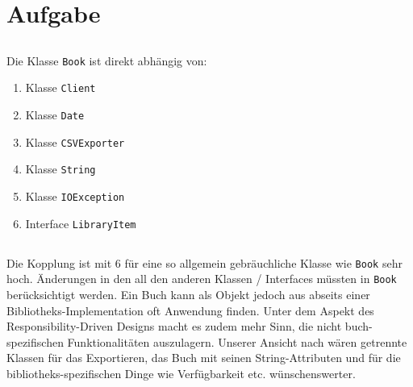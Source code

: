 \chapter{Aufgabe}
\section{}
Die Klasse \texttt{Book} ist direkt abhängig von:
\begin{enumerate}
	\item Klasse \texttt{Client}
	\item Klasse \texttt{Date}
	\item Klasse \texttt{CSVExporter}
	\item Klasse \texttt{String}
	\item Klasse \texttt{IOException}
	\item Interface \texttt{LibraryItem}

\end{enumerate}

\section{}
Die Kopplung ist mit 6 für eine so allgemein gebräuchliche Klasse wie \texttt{Book} sehr hoch.
Änderungen in den all den anderen Klassen / Interfaces müssten in \texttt{Book} berücksichtigt werden. 
Ein Buch kann als Objekt jedoch aus abseits einer Bibliotheks-Implementation oft Anwendung finden. 
Unter dem Aspekt des Responsibility-Driven Designs macht es zudem mehr Sinn, die nicht buch-spezifischen Funktionalitäten auszulagern.
Unserer Ansicht nach wären getrennte Klassen für das Exportieren, das Buch mit seinen String-Attributen und für die bibliotheks-spezifischen Dinge wie Verfügbarkeit etc. wünschenswerter.  